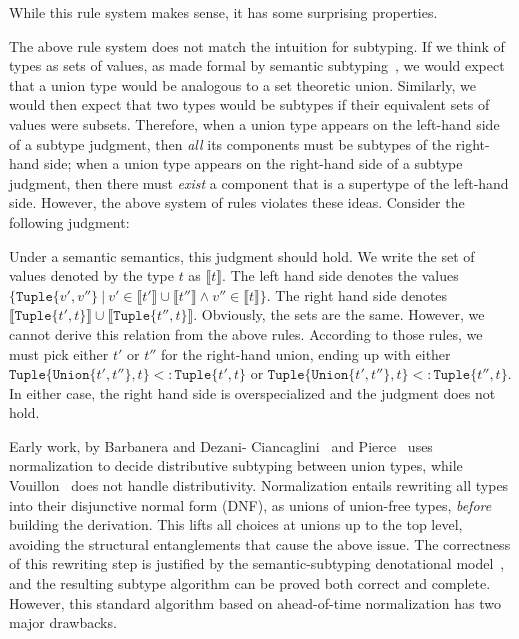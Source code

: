 \documentclass[a4paper,english]{lipics-v2019}
\newcommand{\xt}[1]{\texttt{#1}}
\newcommand{\union}[2]{\xt{Union\{}#1,#2\xt{\}}}
\newcommand{\sub}{<:}
\newcommand{\tuple}[1]{\xt{Tuple\{}#1\xt{\}}}
\begin{document}
\noindent While this rule system makes sense, it has some surprising
properties. 

The above rule system does not match the intuition for subtyping. If we think
of types as sets of values, as made formal by semantic
subtyping~\cite{Pierce1991}, we would expect that a union type would be
analogous to a set theoretic union. Similarly, we would then expect that two
types would be subtypes if their equivalent sets of values were subsets.
Therefore, when a union type appears on the left-hand side of a subtype
judgment, then \emph{all} its components must be subtypes of the right-hand
side; when a union type appears on the right-hand side of a subtype judgment,
then there must \emph{exist} a component that is a supertype of the left-hand
side. However, the above system of rules violates these ideas. Consider the
following judgment:

%
\vspace{-3mm}{\small\[
\tuple{\union{t'}{t''}, t} \ \ \sub\ \ \union{\tuple{t', t}}{\tuple{t'', t}} 
\]}
\vspace{-3mm}
%

\noindent  Under a semantic semantics, this judgment should hold. We write the
set of values denoted by the type $t$ as {\small $\llbracket t \rrbracket$}.
The left hand side denotes the values {\small $\{\tuple{v',v''} ~|~ v' \in
\llbracket t' \rrbracket \cup \llbracket t'' \rrbracket \wedge v'' \in
\llbracket t \rrbracket\}$}. The right hand side denotes {\small $\llbracket
\tuple{t', t} \rrbracket \cup   \llbracket \tuple{t'', t} \rrbracket$}.
Obviously, the sets are the same. However, we cannot derive this relation from
the above rules. According to those rules, we must pick either {\small $t'$}
or {\small $t''$} for the right-hand union, ending up with either {\small
$\tuple{\union{t'}{t''}, t} \sub \tuple{t', t}$} or {\small
$\tuple{\union{t'}{t''}, t} \sub \tuple{t'', t}$}. In either case, the right
hand side is overspecialized and the judgment does not hold.

Early work, by Barbanera and Dezani-
Ciancaglini~\cite{barbanera1991intersection} and Pierce~\cite{Pierce1991} uses
normalization to decide distributive subtyping between union types, while
Vouillon~\cite{Vouillon04} does not handle distributivity. Normalization
entails rewriting all types into their disjunctive normal form (DNF), as
unions of union-free types, \emph{before} building the derivation. This lifts
all choices at unions up to the top level, avoiding the structural
entanglements that cause the above issue. The correctness of this rewriting
step is justified by the semantic-subtyping denotational
model~\cite{Frisch08}, and the resulting subtype algorithm can be proved both
correct and complete. However, this standard algorithm based on ahead-of-time
normalization has two major drawbacks.  
\end{document}
